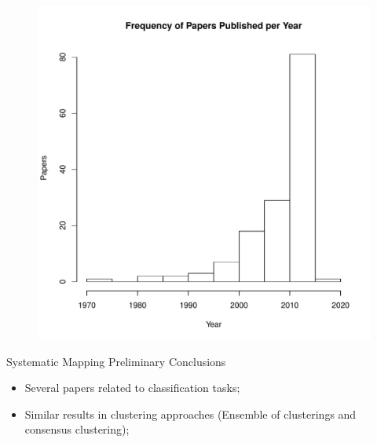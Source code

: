 \documentclass{beamer}
\begin{document}
\begin{frame}
  \begin{figure}
    \centering
    \includegraphics[width=0.7\columnwidth]{hist-paper-year.pdf}
    \label{fig:hist-paper-year}
  \end{figure}
\end{frame}

\begin{frame}{Systematic Mapping Preliminary Conclusions}
  \begin{itemize}
  \item Several papers related to classification tasks;
  \item Similar results in clustering approaches (Ensemble of clusterings and consensus clustering);
  \end{itemize}
\end{frame}
\end{document}
